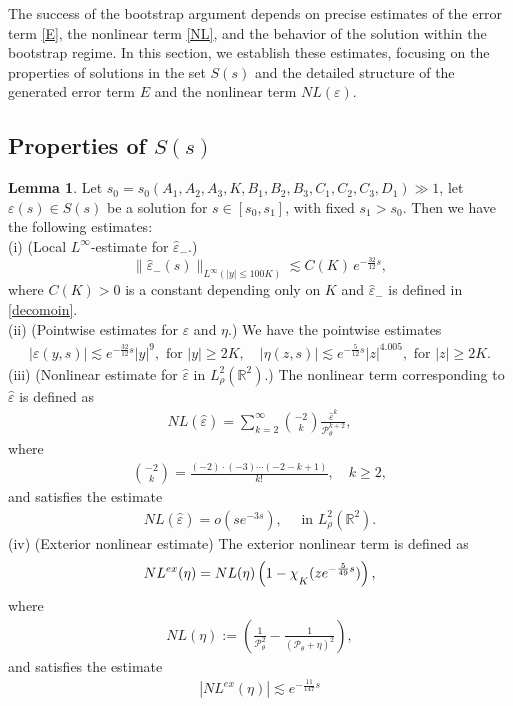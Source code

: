 \documentclass[11pt,reqno]{amsart}
\theoremstyle{definition}
\theoremstyle{bfremark}
\newtheorem{lemma}{Lemma}[section]
\numberwithin{equation}{section}
\newcommand{\veph}{\hat\varepsilon }
\newcommand{\mchi}{\raisebox{0pt}[1ex][1ex]{$\chi$}}
\begin{document}
The success of the bootstrap argument depends on precise estimates of the error term \ref{E}, the nonlinear term \ref{NL}, and the behavior of the solution within the bootstrap regime. In this section, we establish these estimates, focusing on the properties of solutions in the set \(S(s)\) and the detailed structure of the generated error term \(E\) and the nonlinear term \(NL(\varepsilon)\).

\subsection{Properties of \(S(s)\)}
\begin{lemma}
\label{Lemma4.1}
    Let \(s_0 = s_0(A_1, A_2,A_3,K,B_1,B_2,B_3,C_1,C_2,C_3,D_1) \gg 1\), let \(\varepsilon(s) \in S(s)\) be a solution for \(s \in [s_0, s_1]\), with fixed \(s_1 > s_0\). Then we have the following estimates:\\
(i) \textup{(Local \(L^{\infty}\)-estimate for \(\veph_-\).) }
    \begin{equation*}
        \|\veph_-(s)\|_{L^{\infty}(|y| \leq 100K)} \lesssim C(K) \, e^{-\frac{32}{12}s},
    \end{equation*}
    where \(C(K)>0\) is a constant depending only on \(K\) and \(\veph_-\) is defined in \ref{decomoin}.\\
(ii) \textup{(Pointwise estimates for \(\varepsilon\) and \(\eta\)}.) 
We have the pointwise estimates
\begin{align*}
    |\varepsilon(y,s)| \lesssim e^{-\frac{32}{12}s}|y|^9, \text{ for } |y| \geq 2K, \quad |\eta(z,s)| \lesssim e^{-\frac{5}{12}s}|z|^{4.005}, \text{ for } |z| \geq 2K.
\end{align*}
(iii) \textup{(Nonlinear estimate for \(\veph\) in \(L^2_{\rho}(\mathbb{R}^2)\).)} 
The nonlinear term corresponding to \(\veph\) is defined as
\begin{align*}
        NL(\veph)=\sum_{k=2}^{\infty}\binom{-2}{k}\frac{\veph^k}{\mathcal{P}_{\theta}^{k+2}},
    \end{align*}
    where 
    \begin{align*} \binom{-2}{k}=\frac{(-2) \cdot (-3) \cdots(-2-k+1)}{k!}, \quad k \geq 2,
    \end{align*}
    and satisfies the estimate
    \begin{align*}
        NL(\veph)=o(se^{-3s}), \quad \text{ in } L^2_{\rho}(\mathbb{R}^2).
\end{align*}
(iv) \textup{(Exterior nonlinear estimate)}
The exterior nonlinear term is defined as
\begin{align*}
    NL^{ex}(\eta)=NL(\eta)\left(1-\mchi_{K}(ze^{-\frac{5}{49}s})\right),
\end{align*}
where
\begin{align*}
    NL(\eta):=\left(\frac{1}{\mathcal{P}_{\theta}^2}-\frac{1}{(\mathcal{P}_{\theta}+\eta)^2}\right),
\end{align*}
and satisfies the estimate
\begin{align*}
    |NL^{ex}(\eta)| \lesssim e^{-\frac{11}{147}s}
\end{align*}
\end{lemma}
\end{document}
